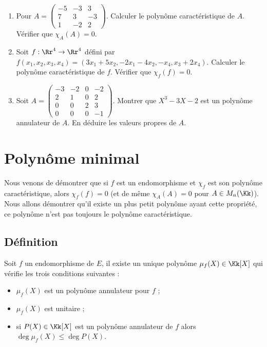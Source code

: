 \documentclass[12pt, class=report,crop=false]{standalone}
\begin{document}
\begin{miniexercices}
\sauteligne
\begin{enumerate}
  \item Pour $A = \left(\begin{smallmatrix}
  -5 & -3 & 3 \\
  7 & 3 & -3 \\
  1 & -2 & 2
  \end{smallmatrix}\right)$. Calculer le polynôme caractéristique de $A$. 
  Vérifier que $\chi_A(A) = 0$.

  
  \item Soit $f : \Rr^4 \to \Rr^4$ défini par
  $f(x_1,x_2,x_3,x_4) = (3x_1+5x_2,-2x_1-4x_2,-x_4,x_3+2x_4)$.
  Calculer le polynôme caractéristique de $f$. Vérifier que $\chi_f(f) = 0$.

  
  \item Soit $A = 
  \left(\begin{smallmatrix}
  -3 & -2 & 0 & -2 \\
2 & 1 & 0 & 2 \\
0 & 0 & 2 & 3 \\
0 & 0 & 0 & -1  
\end{smallmatrix}\right)$. Montrer
  que $X^3 - 3X - 2$ est un polynôme annulateur de $A$. 
  En déduire les valeurs propres de $A$.
\end{enumerate}
\end{miniexercices}



\section{Polynôme minimal}


Nous venons de démontrer que si $f$ est un endomorphisme et $\chi_f$ est son 
polynôme caractéristique, alors $\chi_f(f)=0$ (et de même $\chi_A(A)=0$ pour $A\in M_n(\Kk)$). 
Nous allons démontrer qu'il existe un plus petit polynôme ayant cette propriété, ce polynôme n'est pas toujours le polynôme caractéristique.


\subsection{Définition}



\begin{proposition}
\label{prop:polymini1}
Soit $f$ un endomorphisme de $E$, il existe un unique polynôme $\mu_f(X) \in \Kk[X]$ 
qui vérifie les trois conditions suivantes :
\begin{itemize}
  \item $\mu_f(X)$ est un polynôme annulateur pour $f$ ;
  \item $\mu_f(X)$ est unitaire ;
  \item si $P(X) \in \Kk[X]$  est un polynôme annulateur de $f$ alors $\deg \mu_f(X) \le \deg P(X)$.
\end{itemize}
\end{proposition} 
\end{document}

